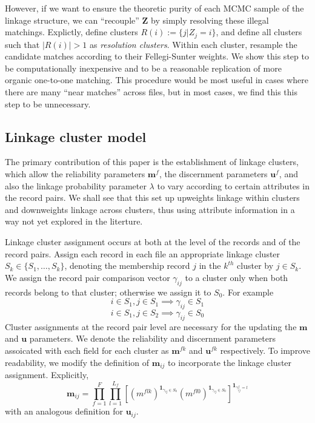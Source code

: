 \documentclass[
  12pt,
]{article}
\begin{document}
However, if we want to ensure the theoretic purity of each MCMC sample
of the linkage structure, we can ``recouple'' \(\mathbf{Z}\) by simply
resolving these illegal matchings. Explictly, define clusters
\(R(i) := \{j | Z_j = i\}\), and define all clusters such that
\(|R(i)| > 1\) as \emph{resolution clusters}. Within each cluster,
resample the candidate matches according to their Fellegi-Sunter
weights. We show this step to be computationally inexpensive and to be a
reasonable replication of more organic one-to-one matching. This
procedure would be most useful in cases where there are many ``near
matches'' across files, but in most cases, we find this this step to be
unnecessary.

\newpage

\hypertarget{linkage-cluster-model}{%
\subsection{Linkage cluster model}\label{linkage-cluster-model}}

The primary contribution of this paper is the establishment of linkage
clusters, which allow the reliability parameters \(\mathbf{m}^f\), the
discernment parameters \(\mathbf{u}^f\), and also the linkage
probability parameter \(\lambda\) to vary according to certain
attributes in the record pairs. We shall see that this set up upweights
linkage within clusters and downweights linkage across clusters, thus
using attribute information in a way not yet explored in the literture.

Linkage cluster assignment occurs at both at the level of the records
and of the record pairs. Assign each record in each file an appropriate
linkage cluster \(S_k \in \{S_1, \ldots, S_k\}\), denoting the
membership record \(j\) in the \(k^{th}\) cluster by \(j \in S_k\). We
assign the record pair comparison vector \(\gamma_{ij}\) to a cluster
only when both records belong to that cluster; otherwise we assign it to
\(S_0\). For example
\[i \in S_1, j \in S_1 \implies \gamma_{ij} \in S_1\]
\[i \in S_1, j \in S_2 \implies \gamma_{ij} \in S_0\] Cluster
assignments at the record pair level are necessary for the updating the
\(\mathbf{m}\) and \(\mathbf{u}\) parameters. We denote the reliability
and discernment parameters assoicated with each field for each cluster
as \(\mathbf{m}^{fk}\) and \(\mathbf{u}^{fk}\) respectively. To improve
readability, we modify the definition of \(\mathbf{m}_{ij}\) to
incorporate the linkage cluster assignment. Explicitly,
\[\mathbf{m}_{ij} = \prod_{f=1}^{F}\prod_{l=1}^{L_f}\left[ \left(m^{flk}\right)^{\mathbf{1}_{\gamma_{ij} \in S_k}}\left(m^{fl0}\right)^{\mathbf{1}_{\gamma_{ij} \in S_0}}\right]^{\mathbf{1}_{\gamma_{ij}^f = l}}\]
with an analogous definition for \(\mathbf{u}_{ij}\).
\end{document}
